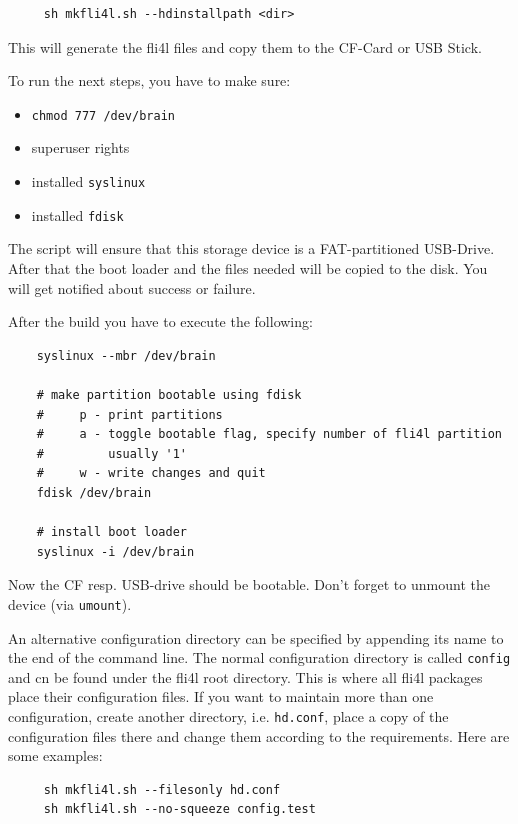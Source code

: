   \begin{verbatim}
     sh mkfli4l.sh --hdinstallpath <dir>
  \end{verbatim}
  \vspace{-2ex}
  This will generate the fli4l files and copy them to the CF-Card or USB Stick.

  To run the next steps, you have to make sure:

   \begin{itemize}
        \item \verb+chmod 777 /dev/brain+
        \item superuser rights
        \item installed \verb+syslinux+
        \item installed \verb+fdisk+
   \end{itemize}

 The script will ensure that this storage device is a FAT-partitioned USB-Drive.
 After that the boot loader and the files needed will be copied to the disk.
 You will get notified about success or failure.

 After the build you have to execute the following:

  \begin{verbatim}
    syslinux --mbr /dev/brain

    # make partition bootable using fdisk
    #     p - print partitions
    #     a - toggle bootable flag, specify number of fli4l partition
    #         usually '1'
    #     w - write changes and quit
    fdisk /dev/brain

    # install boot loader
    syslinux -i /dev/brain
 \end{verbatim}
 \vspace{-2ex}

 Now the CF resp. USB-drive should be bootable.
 Don't forget to unmount the device (via \texttt{umount}).

  \bigskip

  An alternative configuration directory can be specified by appending its name
  to the end of the command line. The normal configuration directory is called
  \texttt{config} and cn be found under the fli4l root directory. This is where all
  fli4l packages place their configuration files.
  If you want to maintain more than one configuration, create another directory, i.e. \texttt{hd.conf},
  place a copy of the configuration files there and change them according to the requirements.
  Here are some examples:

  \begin{verbatim}
     sh mkfli4l.sh --filesonly hd.conf
     sh mkfli4l.sh --no-squeeze config.test
  \end{verbatim}



